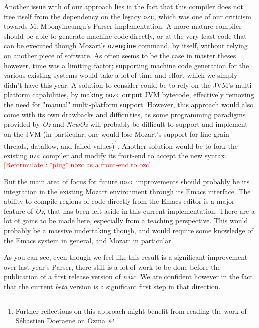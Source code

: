 Another issue with of our approach lies in the fact that this compiler does not free itself from the dependency on the legacy \texttt{ozc}, which was one of our criticism towards M. Mbonyincungu's Parser implementation.
A more mature compiler should be able to generate machine code directly, or at the very least code that can be executed though Mozart's \texttt{ozengine} command, by itself, without relying on another piece of software.
As often seems to be the case in master theses however, time was a limiting factor;
supporting machine code generation for the various existing systems would take a lot of time and effort which we simply didn't have this year.\newline
A solution to consider could be to rely on the JVM's multi-platform capabilities, by making \texttt{nozc} output JVM bytecode, effectively removing the need for  "manual" multi-platform support.
However, this approach would also come with its own drawbacks and difficulties, as some programming paradigms provided by \textit{Oz} and \textit{NewOz} will probably be difficult to support and implement on the JVM (in particular, one would lose Mozart's support for fine-grain threads, dataflow, and failed values)\footnote{Further reflections on this approach might benefit from reading the work of Sébastien Doeraene on Ozma~\cite{Ozma}}.\newline
Another solution would be to fork the existing \texttt{ozc} compiler and modify its front-end to accept the new syntax. \textcolor{red}{[Reformulate : "plug" nozc as a front-end to ozc]}\newline

But the main area of focus for future \texttt{nozc} improvements should probably be its integration in the existing Mozart environment through its Emacs interface.
The ability to compile regions of code directly from the Emacs editor is a major feature of \textit{Oz}, that has been left aside in this current implementation.
There are a lot of gains to be made here, especially from a teaching perspective.
This would probably be a massive undertaking though, and would require some knowledge of the Emacs system in general, and Mozart in particular.\newline

As you can see, even though we feel like this result is a significant improvement over last year's Parser, there still is a lot of work to be done before the publication of a first release version of \textit{nozc}.
We are confident however in the fact that the current \textit{beta} version is a significant first step in that direction.